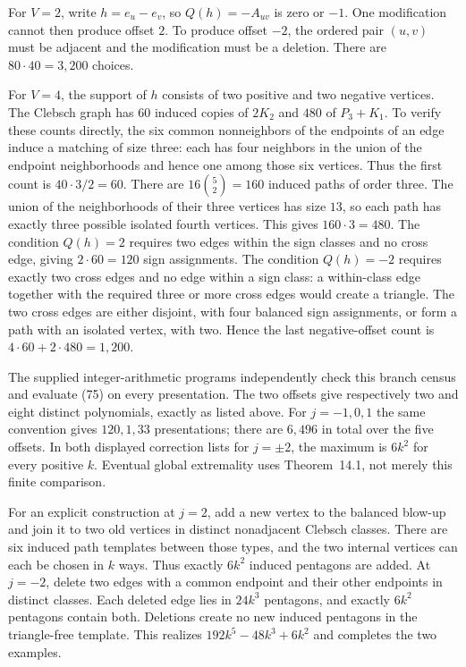 \documentclass[11pt]{amsart}
\theoremstyle{definition}
\theoremstyle{remark}
\begin{document}
For $V=2$, write $h=e_u-e_v$, so $Q(h)=-A_{uv}$ is zero or $-1$.
One modification cannot then produce offset $2$. To produce offset $-2$,
the ordered pair $(u,v)$ must be adjacent and the modification must be a
deletion. There are $80\cdot40=3,200$ choices.

For $V=4$, the support of $h$ consists of two positive and two negative
vertices. The Clebsch graph has $60$ induced copies of $2K_2$ and $480$
of $P_3+K_1$. To verify these counts directly, the six common nonneighbors
of the endpoints of an edge induce a matching of size three: each has
four neighbors in the union of the endpoint neighborhoods and hence one
among those six vertices. Thus the first count is $40\cdot3/2=60$.
There are $16\binom{5}{2}=160$ induced paths of order three. The union
of the neighborhoods of their three vertices has size $13$, so each path
has exactly three possible isolated fourth vertices. This gives
$160\cdot3=480$.
The condition $Q(h)=2$ requires two edges within the sign classes and no
cross edge, giving $2\cdot60=120$ sign assignments. The condition
$Q(h)=-2$ requires exactly two cross edges and no edge within a sign
class: a within-class edge together with the required three or more cross
edges would create a triangle. The two cross edges are either disjoint,
with four balanced sign assignments, or form a path with an isolated
vertex, with two. Hence the last negative-offset count is
$4\cdot60+2\cdot480=1,200$.

The supplied integer-arithmetic programs independently check this branch
census and evaluate (75) on every presentation. The two offsets give
respectively two and eight distinct polynomials, exactly as listed above.
For $j=-1,0,1$ the same convention gives $120,1,33$ presentations;
there are $6,496$ in total over the five offsets. In both displayed
correction lists for $j=\pm2$, the maximum is $6k^2$ for every positive
$k$. Eventual global extremality uses Theorem~14.1, not merely this finite
comparison.

For an explicit construction at $j=2$, add a new vertex to the balanced
blow-up and join it to two old vertices in distinct nonadjacent Clebsch
classes. There are six induced path templates between those types, and
the two internal vertices can each be chosen in $k$ ways. Thus exactly
$6k^2$ induced pentagons are added. At $j=-2$, delete two edges with a
common endpoint and their other endpoints in distinct classes. Each
deleted edge lies in $24k^3$ pentagons, and exactly $6k^2$ pentagons
contain both. Deletions create no new induced pentagons in the
triangle-free template. This realizes $192k^5-48k^3+6k^2$ and completes
the two examples.
\end{document}
